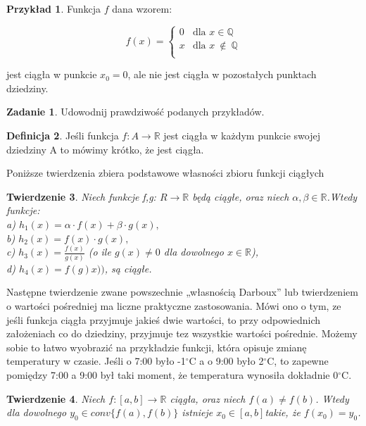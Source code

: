 \documentclass[12pt,a4paper]{article}
\newtheorem{tw}{Twierdzenie}[section]
\theoremstyle{definition}
\newtheorem{df}[tw]{Definicja}
\newtheorem{ex}[tw]{Przykład}
\newtheorem{zad}{Zadanie}
\begin{document}
\begin{ex}
Funkcja $f$ dana wzorem:
\begin{center}
\begin{displaymath}
f(x)= \left\{ \begin{array}{ll}
0 & \textrm{dla $x \in \mathbb{Q}$}\\
x & \textrm{dla $x\ \notin\ \mathbb{Q}$}\\
\end{array} \right.
\end{displaymath}
\end{center}
jest ciągła w punkcie $x_{0}=0$, ale nie jest ciągła w pozostałych punktach dziedziny.
\end{ex}

\begin{zad}
Udowodnij prawdziwość podanych przykładów.
\end{zad}
\begin{df}
Jeśli funkcja 
$f:A \to \mathbb{R}$ jest ciągła w każdym punkcie swojej dziedziny A to mówimy krótko, że jest ciągła.
\end{df}
\begin{center}
Poniższe twierdzenia zbiera podstawowe własności zbioru funkcji ciągłych
\end{center}
\begin{tw}
Niech funkcje f,g: $R \to\mathbb{R}$ będą ciągłe, oraz niech $\alpha ,\beta \in\mathbb{R}$.Wtedy funkcje:
\\a) $h_{1}(x)=\alpha \cdot f(x)+ \beta \cdot g(x),$
\\b) $h_{2}(x)=f(x) \cdot g(x),$
\\c) $h_{3}(x)=\frac{f(x)}{g(x)}$ (o ile $g(x) \neq 0$ dla dowolnego $x\in\mathbb{R}$),
\\d) $h_{4}(x)=f(g)x))$,
\newline są ciągłe.
\end{tw}
Następne twierdzenie zwane powszechnie „własnością Darboux” lub twierdzeniem
o wartości pośredniej ma liczne praktyczne zastosowania. Mówi ono o tym,
ze jeśli funkcja ciągła przyjmuje jakieś dwie wartości, to przy odpowiednich założeniach
co do dziedziny, przyjmuje tez wszystkie wartości pośrednie. Możemy sobie to
łatwo wyobrazić na przykładzie funkcji, która opisuje zmianę temperatury w czasie. Jeśli o 7:00 było -1$^{\circ}$C a o 9:00 było 2$^{\circ}$C, to zapewne pomiędzy 7:00 a 9:00 był taki moment, że temperatura wynosiła dokładnie 0$^{\circ}$C.
\begin{tw}
Niech $f:[a,b]\to\mathbb{R}$ ciągła, oraz niech $f(a)\neq f(b)$. Wtedy dla dowolnego $y_{0}\in conv\{f(a),f(b)\}$ istnieje $x_{0}\in[a,b]$takie, że $f(x_{0})=y_{0}$.
\end{tw}
\end{document}
